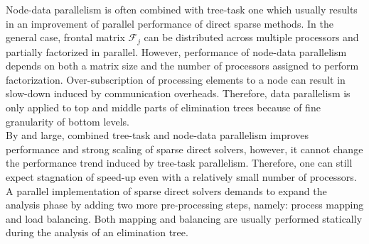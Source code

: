 Node-data parallelism is often combined with tree-task one which usually results in an improvement of parallel performance of direct sparse methods. In the general case, frontal matrix $\mathcal{F}_{j}$ can be distributed across multiple processors and partially factorized in parallel. However, performance of node-data parallelism depends on both a matrix size and the number of processors assigned to perform factorization. Over-subscription of processing elements to a node can result in slow-down induced by communication overheads. Therefore,  data parallelism is only applied to top  and middle parts of elimination trees because of fine granularity of bottom levels.\\ 



By and large, combined tree-task and node-data parallelism improves performance and strong scaling of sparse direct solvers, however, it cannot change the performance trend induced by tree-task parallelism. Therefore, one can still expect  stagnation of speed-up even with a relatively small number of processors.\\


A parallel implementation of sparse direct solvers demands to expand the analysis phase by adding 
two more pre-processing steps, namely: process mapping and load balancing. Both mapping and balancing are usually performed statically during the analysis of an elimination tree.\\ %






